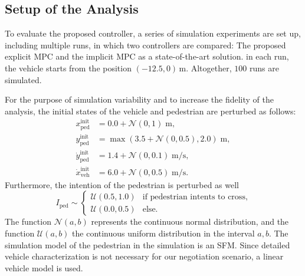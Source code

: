\documentclass[conference]{IEEEtran}
\begin{document}
	
	\subsection{Setup of the Analysis}
	To evaluate the proposed controller, a series of simulation experiments are set up, including multiple runs, in which two controllers are compared: The proposed explicit MPC and the implicit MPC as a state-of-the-art solution. in each run, the vehicle starts from the position $(-12.5, 0)\,$m. Altogether, $100$ runs are simulated.
	
	
	For the purpose of simulation variability and to increase the fidelity of the analysis, the initial states of the vehicle and pedestrian are perturbed as follows:
	\begin{align*}
		x_{\mathrm{ped}}^{\mathrm{init}} &= 0.0 + \mathcal{N}(0, 1) \; \mathrm{m},\\
		y_{\mathrm{ped}}^{\mathrm{init}} &= \max(3.5 + \mathcal{N}(0, 0.5),  2.0)  \; \mathrm{m},\\
		\dot y_{\mathrm{ped}}^{\mathrm{init}} &= 1.4 + \mathcal{N}(0, 0.1)  \; \mathrm{m/s}, \\
		\dot x_{\mathrm{veh}}^{\mathrm{init}} &= 6.0 + \mathcal{N}(0, 0.5)  \; \mathrm{m/s}.
	\end{align*}
	Furthermore, the intention of the pedestrian is perturbed as well
	\begin{equation}
		I_{\mathrm{ped}} \sim \begin{cases}
			\mathcal{U}(0.5, 1.0) & \text{if pedestrian intents to cross,} \\
			\mathcal{U}(0.0, 0.5) & \mathrm{else.}
		\end{cases}
	\end{equation}
	The function $\mathcal{N}\left(a,b\right)$ represents the continuous normal distribution, and the function $\mathcal{U}\left(a,b\right)$ the continuous uniform distribution in the interval $ a,b$. The simulation model of the pedestrian in the simulation is an SFM. Since detailed vehicle characterization is not necessary for our negotiation scenario, a linear vehicle model is used.
	
\end{document}
